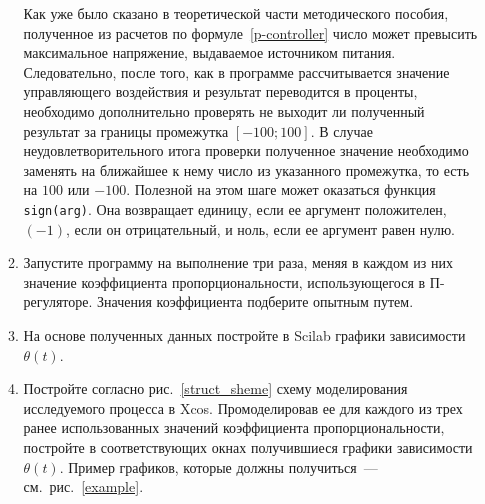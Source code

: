 \documentclass[12pt,a4paper,openany]{extarticle}
\begin{document}
\begin{enumerate}
\begin{enumerate}
		Как уже было сказано в теоретической части методического пособия, полученное из расчетов по формуле~\eqref{p-controller} число может превысить максимальное напряжение, выдаваемое источником питания.
		Следовательно, после того, как в программе рассчитывается значение управляющего воздействия и результат переводится в проценты, необходимо дополнительно проверять не выходит ли полученный результат за границы промежутка  $[-100;100]$.
		В случае неудовлетворительного итога проверки полученное значение необходимо заменять на ближайшее к нему число из указанного промежутка, то есть на $100$ или $-100$. 
		Полезной на этом шаге может оказаться функция \verb|sign(arg)|.
		Она возвращает единицу, если ее аргумент положителен, $(-1)$, если он отрицательный, и ноль, если ее аргумент равен нулю.
		\item Запустите программу на выполнение три раза, меняя в каждом из них значение коэффициента пропорциональности, использующегося в П-регуляторе.
		Значения коэффициента подберите опытным путем.
		\item На основе полученных данных постройте в Scilab графики зависимости $\theta(t)$.
		\item Постройте согласно рис.~\ref{struct_sheme} схему моделирования исследуемого процесса в Xcos.
		Промоделировав ее для каждого из трех ранее использованных значений коэффициента пропорциональности, постройте в соответствующих окнах получившиеся графики зависимости $\theta(t)$.
		Пример графиков, которые должны получиться~--- см.~рис.~\ref{example}.
		

\end{enumerate}
\end{enumerate}
\end{document}
